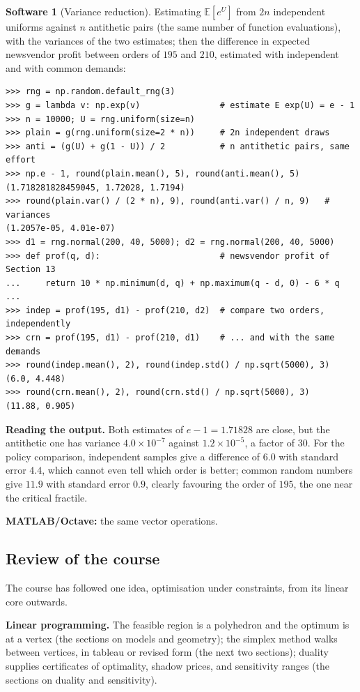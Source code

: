 \documentclass[11pt,a4paper]{article}
\numberwithin{equation}{section}
\theoremstyle{definition}
\newtheorem{software}[thm]{Software}
\begin{document}
\begin{software}[Variance reduction]
\label{sw:vr}
Estimating $\mathbb E[e^U]$ from $2n$ independent uniforms against $n$ antithetic pairs (the same number of function evaluations), with the variances of the two estimates; then the difference in expected newsvendor profit between orders of $195$ and $210$, estimated with independent and with common demands:
{\small\begin{verbatim}
>>> rng = np.random.default_rng(3)
>>> g = lambda v: np.exp(v)                # estimate E exp(U) = e - 1
>>> n = 10000; U = rng.uniform(size=n)
>>> plain = g(rng.uniform(size=2 * n))     # 2n independent draws
>>> anti = (g(U) + g(1 - U)) / 2           # n antithetic pairs, same effort
>>> np.e - 1, round(plain.mean(), 5), round(anti.mean(), 5)
(1.718281828459045, 1.72028, 1.7194)
>>> round(plain.var() / (2 * n), 9), round(anti.var() / n, 9)   # variances
(1.2057e-05, 4.01e-07)
>>> d1 = rng.normal(200, 40, 5000); d2 = rng.normal(200, 40, 5000)
>>> def prof(q, d):                        # newsvendor profit of Section 13
...     return 10 * np.minimum(d, q) + np.maximum(q - d, 0) - 6 * q
...
>>> indep = prof(195, d1) - prof(210, d2)  # compare two orders, independently
>>> crn = prof(195, d1) - prof(210, d1)    # ... and with the same demands
>>> round(indep.mean(), 2), round(indep.std() / np.sqrt(5000), 3)
(6.0, 4.448)
>>> round(crn.mean(), 2), round(crn.std() / np.sqrt(5000), 3)
(11.88, 0.905)
\end{verbatim}}
\textbf{Reading the output.} Both estimates of $e - 1 = 1.71828$ are close, but the antithetic one has variance $4.0 \times 10^{-7}$ against $1.2 \times 10^{-5}$, a factor of $30$. For the policy comparison, independent samples give a difference of $6.0$ with standard error $4.4$, which cannot even tell which order is better; common random numbers give
$11.9$ with standard error $0.9$, clearly favouring the order of $195$, the one near the critical fractile.

\textbf{MATLAB/Octave:} the same vector operations.
\end{software}

\subsection{Review of the course}
\label{ssec:orreview}

The course has followed one idea, optimisation under constraints, from its linear core outwards.

\textbf{Linear programming.} The feasible region is a polyhedron and the optimum is at a vertex (the sections on models and geometry); the simplex method walks between vertices, in tableau or revised form (the next two sections); duality supplies certificates of optimality, shadow prices, and sensitivity ranges (the sections on duality and sensitivity).
\end{document}
